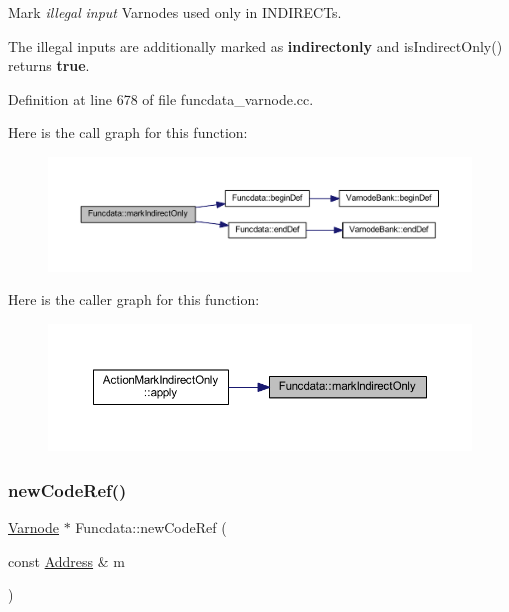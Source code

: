Mark {\itshape illegal} {\itshape input} Varnodes used only in I\+N\+D\+I\+R\+E\+C\+Ts. 

The illegal inputs are additionally marked as {\bfseries{indirectonly}} and is\+Indirect\+Only() returns {\bfseries{true}}. 

Definition at line 678 of file funcdata\+\_\+varnode.\+cc.

Here is the call graph for this function\+:
\nopagebreak
\begin{figure}[H]
\begin{center}
\leavevmode
\includegraphics[width=350pt]{class_funcdata_a41dc1e061256c4cc55e7afcf5995f435_cgraph}
\end{center}
\end{figure}
Here is the caller graph for this function\+:
\nopagebreak
\begin{figure}[H]
\begin{center}
\leavevmode
\includegraphics[width=350pt]{class_funcdata_a41dc1e061256c4cc55e7afcf5995f435_icgraph}
\end{center}
\end{figure}
\mbox{\label{class_funcdata_a24e80f56ef371a0010a9e67ae8510086}} 
\subsubsection{\texorpdfstring{newCodeRef()}{newCodeRef()}}
{\footnotesize\ttfamily \mbox{\hyperlink{class_varnode}{Varnode}} $\ast$ Funcdata\+::new\+Code\+Ref (\begin{DoxyParamCaption}\item[{const \mbox{\hyperlink{class_address}{Address}} \&}]{m }\end{DoxyParamCaption})}



